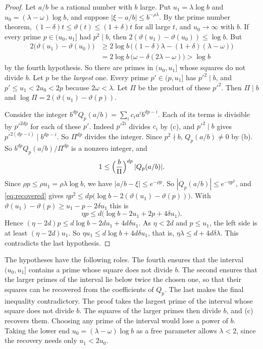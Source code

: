 \documentclass[11pt]{amsart}
\theoremstyle{definition}
\theoremstyle{remark}
\numberwithin{equation}{section}
\begin{document}
\begin{proof}
Let $a/b$ be a rational number with $b$ large. Put $u_1=\lambda\log b$ and $u_0=(\lambda-\omega)\log b$,
and suppose $|\xi-a/b|\le b^{-\rho\lambda}$. By the prime number theorem,
$(1-\delta)t\le\vartheta(t)\le(1+\delta)t$ for all large $t$, and $u_0\to\infty$ with $b$. If every prime
$p\in(u_0,u_1]$ had $p^2\mid b$, then $2(\vartheta(u_1)-\vartheta(u_0))\le\log b$. But
\begin{align*}
 2\bigl(\vartheta(u_1)-\vartheta(u_0)\bigr)&\ge2\log b\,\bigl((1-\delta)\lambda-(1+\delta)(\lambda-\omega)\bigr)\\
 &=2\log b\,\bigl(\omega-\delta(2\lambda-\omega)\bigr)>\log b
\end{align*}
by the fourth hypothesis. So there are primes in $(u_0,u_1]$ whose squares do not divide $b$. Let $p$ be
the \emph{largest} one. Every prime $p'\in(p,u_1]$ has $p'^2\mid b$, and $p'\le u_1<2u_0<2p$ because
$2\omega<\lambda$. Let $\Pi$ be the product of these $p'^2$. Then $\Pi\mid b$ and
$\log\Pi=2(\vartheta(u_1)-\vartheta(p))$.

Consider the integer $b^{dp}Q_p(a/b)=\sum_ic_ia^ib^{dp-i}$. Each of its terms is divisible by $p'^{2dp}$
for each of these $p'$. Indeed $p'^{2i}$ divides $c_i$ by (c), and $p'^2\mid b$ gives
$p'^{2(dp-i)}\mid b^{dp-i}$. So $\Pi^{dp}$ divides the integer. Since $p^2\nmid b$, $Q_p(a/b)\ne0$ by (b).
So $b^{dp}Q_p(a/b)/\Pi^{dp}$ is a nonzero integer, and
\begin{equation}\label{eq:recovered}
 1\le\Bigl(\frac b\Pi\Bigr)^{dp}\,|Q_p(a/b)| .
\end{equation}
Since $\rho p\le\rho u_1=\rho\lambda\log b$, we have $|a/b-\xi|\le e^{-\rho p}$. So
$|Q_p(a/b)|\le e^{-\eta p^2}$, and \eqref{eq:recovered} gives
$\eta p^2\le dp\bigl(\log b-2(\vartheta(u_1)-\vartheta(p))\bigr)$. With
$\vartheta(u_1)-\vartheta(p)\ge u_1-p-2\delta u_1$ this is
\[
 \eta p\le d\bigl(\log b-2u_1+2p+4\delta u_1\bigr).
\]
Hence $(\eta-2d)p\le d\log b-2du_1+4d\delta u_1$. As $\eta<2d$ and $p\le u_1$, the left side is at least
$(\eta-2d)u_1$. So $\eta u_1\le d\log b+4d\delta u_1$, that is, $\eta\lambda\le d+4d\delta\lambda$. This
contradicts the last hypothesis.
\end{proof}

The hypotheses have the following roles. The fourth ensures that the interval $(u_0,u_1]$ contains a prime
whose square does not divide $b$. The second ensures that the larger primes of the interval lie below twice
the chosen one, so that their squares can be recovered from the coefficients of $Q_p$. The last makes the
final inequality contradictory. The proof takes the largest prime of the interval whose square does not
divide $b$. The squares of the larger primes then divide $b$, and (c) recovers them. Choosing any prime of
the interval would lose a power of $b$. Taking the lower end $u_0=(\lambda-\omega)\log b$ as a free
parameter allows $\lambda<2$, since the recovery needs only $u_1<2u_0$.
\end{document}
